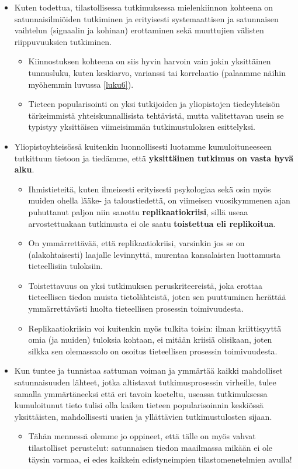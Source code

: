 \documentclass[
]{book}
\providecommand{\tightlist}{%
  \setlength{\itemsep}{0pt}\setlength{\parskip}{0pt}}
\begin{document}
\begin{itemize}
\tightlist
\item
  Kuten todettua, tilastollisessa tutkimuksessa mielenkiinnon kohteena on satunnaisilmiöiden tutkiminen ja erityisesti systemaattisen ja satunnaisen vaihtelun (signaalin ja kohinan) erottaminen sekä muuttujien välisten riippuvuuksien tutkiminen.

  \begin{itemize}
  \tightlist
  \item
    Kiinnostuksen kohteena on siis hyvin harvoin vain jokin yksittäinen tunnusluku, kuten keskiarvo, varianssi tai korrelaatio (palaamme näihin myöhemmin luvussa \ref{luku6}).
  \item
    Tieteen popularisointi on yksi tutkijoiden ja yliopistojen tiedeyhteisön tärkeimmistä yhteiskunnallisista tehtävistä, mutta valitettavan usein se typistyy yksittäisen viimeisimmän tutkimustuloksen esittelyksi.
  \end{itemize}
\item
  Yliopistoyhteisössä kuitenkin luonnollisesti luotamme kumuloituneeseen tutkittuun tietoon ja tiedämme, että \textbf{yksittäinen tutkimus on vasta hyvä alku}.

  \begin{itemize}
  \tightlist
  \item
    Ihmistieteitä, kuten ilmeisesti erityisesti psykologiaa sekä osin myös muiden ohella lääke- ja taloustiedettä, on viimeisen vuosikymmenen ajan puhuttanut paljon niin sanottu \textbf{replikaatiokriisi}, sillä useaa arvostettuakaan tutkimusta ei ole saatu \textbf{toistettua eli replikoitua}.
  \item
    On ymmärrettävää, että replikaatiokriisi, varsinkin jos se on (alakohtaisesti) laajalle levinnyttä, murentaa kansalaisten luottamusta tieteellisiin tuloksiin.
  \item
    Toistettavuus on yksi tutkimuksen peruskriteereistä, joka erottaa tieteellisen tiedon muista tietolähteistä, joten sen puuttuminen herättää ymmärrettävästi huolta tieteellisen prosessin toimivuudesta.
  \item
    Replikaatiokriisin voi kuitenkin myös tulkita toisin: ilman kriittisyyttä omia (ja muiden) tuloksia kohtaan, ei mitään kriisiä olisikaan, joten silkka sen olemassaolo on osoitus tieteellisen prosessin toimivuudesta.
  \end{itemize}
\item
  Kun tuntee ja tunnistaa sattuman voiman ja ymmärtää kaikki mahdolliset satunnaisuuden lähteet, jotka altistavat tutkimusprosessin virheille, tulee samalla ymmärtäneeksi että eri tavoin koeteltu, useassa tutkimuksessa kumuloitunut tieto tulisi olla kaiken tieteen popularisoinnin keskiössä yksittäisten, mahdollisesti uusien ja yllättävien tutkimustulosten sijaan.

  \begin{itemize}
  \tightlist
  \item
    Tähän mennessä olemme jo oppineet, että tälle on myös vahvat tilastolliset perustelut: satunnaisen tiedon maailmassa mikään ei ole täysin varmaa, ei edes kaikkein edistyneimpien tilastomenetelmien avulla!
  \end{itemize}
\end{itemize}
\end{document}
